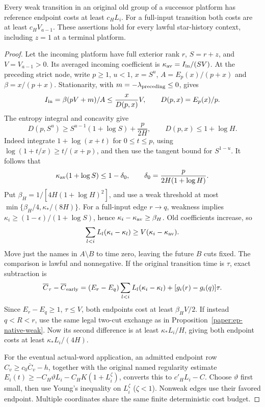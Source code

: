 \begin{proposition}\label{paper:ep-old-weak}
Every weak transition in an original old group of a successor
platform has reference endpoint costs at least $c_HL_i$.
For a full-input transition both costs are at least $c_HV_{a-1}$.
These assertions hold for every lawful star-history context, including
$z=1$ at a terminal platform.
\end{proposition}
\begin{proof}
Let the incoming platform have full exterior rank $r$, $S=r+z$, and
$V=V_{a-1}>0$.  Its averaged incoming coefficient is
$\kappa_{\rm av}=I_{\rm in}/(SV)$.  At the preceding strict node,
write $p\geq1$, $u<1$, $x=S^u$,
$A=E_p(x)/(p+x)$ and $\beta=x/(p+x)$.
Stationarity, with $m=-\lambda_{\rm preceding}\leq0$, gives
\[
 I_{\rm in}=\beta(pV+m)/A\leq \frac{x}{D(p,x)}V,
 \qquad D(p,x)=E_p(x)/p.
\]
The entropy integral and concavity give
\[
 D(p,S^u)\geq S^{u-1}(1+\log S)+\frac{p}{2H},
 \qquad D(p,x)\leq1+\log H.
\]
Indeed integrate $1+\log(x+t)$ for $0\leq t\leq p$, using
$\log(1+t/x)\geq t/(x+p)$, and then use the tangent bound for
$S^{1-u}$.  It follows that
\[
 \kappa_{\rm av}(1+\log S)\leq1-\delta_0,
 \qquad \delta_0=\frac{p}{2H(1+\log H)}.
\]
Put $\beta_H=1/[4H(1+\log H)^2]$, and use a weak threshold
at most $\min\{\beta_H/4,\kappa_*/(8H)\}$.
For a full-input edge $r\to q$, weakness implies
$\kappa_i\geq(1-\epsilon)/(1+\log S)$, hence
$\kappa_i-\kappa_{\rm av}\geq\beta_H$.
Old coefficients increase, so
\[
 \sum_{l<i}L_l(\kappa_i-\kappa_l)
 \geq V(\kappa_i-\kappa_{\rm av}).
\]
Move just the names in $A\setminus B$ to time zero, leaving the
future $B$ cuts fixed.  The comparison is lawful and nonnegative.
If the original transition time is $\tau$, exact subtraction is
\[
 \overline C_\tau-\overline C_{\rm early}
 =(E_r-E_q)\sum_{l<i}L_l(\kappa_i-\kappa_l)
       +[g_i(r)-g_i(q)]\tau.
\]
Since $E_r-E_q\geq1$, $\tau\leq V$, both endpoints cost at least
$\beta_HV/2$.  If instead $q<R<r$, use the same legal two-cut
exchange as in Proposition~\ref{paper:ep-native-weak}.
Now its second difference is at least $\kappa_*L_i/H$, giving
both endpoint costs at least $\kappa_*L_i/(4H)$.

For the eventual actual-word application, an admitted endpoint row
$C_v\geq c_0\overline C_v-h$, together with the original named
regularity estimate
$E_i(t)\geq-C_H\vartheta L_i-C_HK(1+L_i^\zeta)$,
converts this to $c'_HL_i-C$.  Choose $\vartheta$ first small, then
use Young's inequality on $L_i^\zeta$ ($\zeta<1$).  Nonweak edges
use their favored endpoint.  Multiple coordinates share the same
finite deterministic cost budget.
\end{proof}

